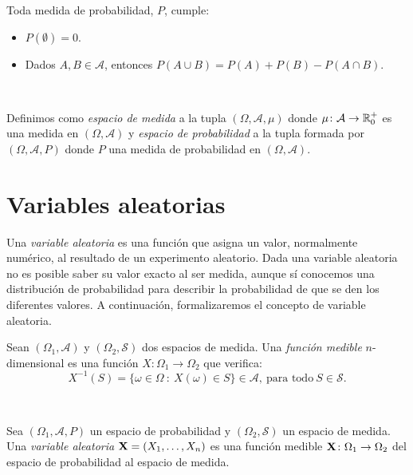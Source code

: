 \documentclass[oneside,openright,titlepage,numbers=noenddot,openany,headinclude,footinclude=true,
cleardoublepage=empty,abstractoff,BCOR=5mm,paper=a4,fontsize=12pt,main=spanish]{scrreprt}
\begin{document}
\begin{proposition} Toda medida de probabilidad, $P$, cumple:

\begin{itemize}
\item $P(\emptyset) = 0$.
\item Dados $A,B \in \mathcal{A}$, entonces $P(A \cup B) = P(A) + P(B) - P(A \cap B)$.
\end{itemize}
\end{proposition}\

\begin{definition}
Definimos como \textit{espacio de medida} a la tupla $(\Omega, \mathcal{A}, \mu)$ donde $\mu \colon \mathcal{A}\to \mathbb{R}_0^+$ es una medida en $(\Omega, \mathcal{A})$ y \textit{espacio de probabilidad} a la tupla formada por $(\Omega, \mathcal{A}, P)$ donde $P$ una medida de probabilidad en $(\Omega, \mathcal{A})$.
\end{definition}

\section{Variables aleatorias}

Una \textit{variable aleatoria} es una función que asigna un valor, normalmente numérico, al resultado de un experimento aleatorio. Dada una variable aleatoria no es posible saber su valor exacto al ser medida, aunque sí conocemos una distribución de probabilidad para describir la probabilidad de que se den los diferentes valores. A continuación, formalizaremos el concepto de variable aleatoria.\\

\begin{definition}
Sean $(\Omega_1,\mathcal{A})$ y $(\Omega_2, \mathcal{S})$ dos espacios de medida. Una \textit{función medible} $n$-dimensional es una función $X\colon \Omega_1 \to \Omega_2$ que verifica: $$X^{-1}(S)=\{\omega \in \Omega \ : \ X(\omega)\in S\} \in \mathcal{A}, \ \text{para todo} \ S \in \mathcal{S}.$$
\end{definition}\

\begin{definition}
Sea $(\Omega_1, \mathcal{A},P)$ un espacio de probabilidad y $(\Omega_2, \mathcal{S})$ un espacio de medida. Una \textit{variable aleatoria} $\textbf{X}=(X_1,\dots,X_n)$ es una función medible $\textbf{X}\colon \Omega_1 \to \Omega_2$ del espacio de probabilidad al espacio de medida.
\end{definition}\
\end{document}
